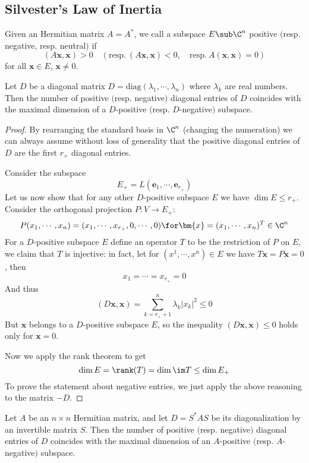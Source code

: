 \subsection{Silvester's Law of Inertia}
\begin{definition}
Given an Hermitian matrix $A=A^*$, we call a subspace $E\sub\C^n$ positive $($resp. negative, resp. neutral$)$ if
\[(A\bm{x},\bm{x})>0\quad(\text{resp.}\ (A\bm{x},\bm{x})<0,\quad\text{resp.}\ A(\bm{x},\bm{x})=0)\]
for all $\bm{x}\in E$, $\bm{x}\neq0$.
\end{definition}
\begin{lemma}
Let $D$ be a diagonal matrix $D=\mathrm{diag}(\lambda_1,\cdots,\lambda_n)$ where $\lambda_k$ are real numbers. Then the number of positive $($resp. negative$)$ diagonal entries of $D$ coincides with the maximal dimension of a $D$-positive $($resp. $D$-negative$)$ subspace.
\end{lemma}
\begin{proof}
By rearranging the standard basis in $\C^n$ (changing the numeration) we can always assume without loss of generality that the positive diagonal entries of $D$ are the first $r_+$ diagonal entries.\par
Consider the subspace
\[E_+=L(\bm{e}_1,\cdots,\bm{e}_{r_+})\]
Let us now show that for any other $D$-positive subspace $E$ we have $\dim E\leq r_+$. Consider the orthogonal projection $P:V\to E_+$:
\[P(x_1,\cdots,x_n)=(x_1,\cdots,x_{r_+},0,\cdots,0)\for \bm{x}=(x_1,\cdots,x_n)^T\in\C^n\]
For a $D$-positive subspace $E$ define an operator $T$ to be the restriction of $P$ on $E$, we claim that $T$ is injective: in fact, let for $(x^1,\cdots,x^n)\in E$ we have $T\bm{x}=P\bm{x}=0$, then
\[x_1=\cdots=x_{r_+}=0\]
And thus
\[(D\bm{x},\bm{x})=\sum_{k=r_++1}^{n}\lambda_k|x_k|^2\leq 0\]
But $\bm{x}$ belongs to a $D$-positive subspace $E$, so the inequality $(D\bm{x},\bm{x})\leq 0$ holds only for $\bm{x}=0$.\par
Now we apply the rank theorem to get
\[\dim E=\rank(T)=\dim\im T\leq\dim E_+\]
To prove the statement about negative entries, we just apply the above reasoning to the matrix $-D$.
\end{proof}
\begin{theorem}
Let $A$ be an $n\times n$ Hermitian matrix, and let $D=S^*AS$ be its diagonalization by an invertible matrix $S$. Then the number of positive $($resp. negative$)$ diagonal entries of $D$ coincides with the maximal dimension of an $A$-positive $($resp. $A$-negative$)$ subspace.
\end{theorem}

